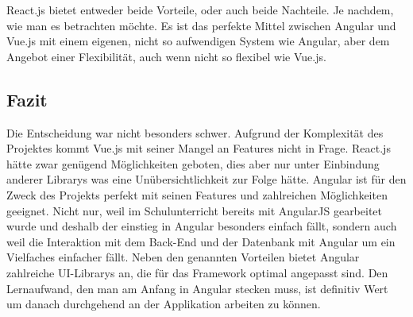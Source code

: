 React.js bietet entweder beide Vorteile, oder auch beide Nachteile. Je nachdem, wie man es betrachten möchte. Es ist das perfekte Mittel zwischen Angular und Vue.js mit einem eigenen, nicht so aufwendigen System wie Angular, aber dem Angebot einer Flexibilität, auch wenn nicht so flexibel wie Vue.js.
\subsection{Fazit}
 Die Entscheidung war nicht besonders schwer. Aufgrund der Komplexität des Projektes kommt Vue.js mit seiner Mangel an Features nicht in Frage. React.js hätte zwar genügend Möglichkeiten geboten, dies aber nur unter Einbindung anderer Librarys was eine Unübersichtlichkeit zur Folge hätte. Angular ist für den Zweck des Projekts perfekt mit seinen Features und zahlreichen Möglichkeiten geeignet. Nicht nur, weil im Schulunterricht bereits mit AngularJS gearbeitet wurde und deshalb der einstieg in Angular besonders einfach fällt, sondern auch weil die Interaktion mit dem Back-End und der Datenbank mit Angular um ein Vielfaches einfacher fällt. Neben den genannten Vorteilen bietet Angular zahlreiche UI-Librarys an, die für das Framework optimal angepasst sind. Den Lernaufwand, den man am Anfang in Angular stecken muss, ist definitiv Wert um danach durchgehend an der Applikation arbeiten zu können.
